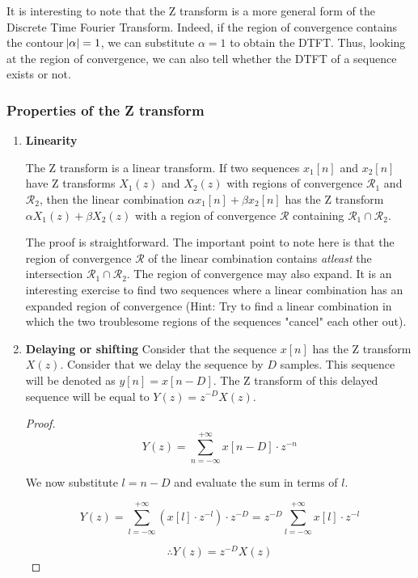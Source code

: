 \documentclass{article}
\theoremstyle{definition}
\begin{document}
It is interesting to note that the Z transform is a more general form of the Discrete Time Fourier Transform. Indeed, if the region of convergence contains the contour $\abs{\alpha} = 1$, we can substitute $\alpha = 1$ to obtain the DTFT. Thus, looking at the region of convergence, we can also tell whether the DTFT of a sequence exists or not. 

\subsubsection{Properties of the Z transform}

\begin{enumerate}
\item \textbf{Linearity}

The Z transform is a linear transform. If two sequences $x_1[n]$ and $x_2[n]$ have Z transforms $X_1(z)$ and $X_2(z)$ with regions of convergence $\mathcal{R}_1$ and $\mathcal{R}_2$, then the linear combination $\alpha x_1[n] + \beta x_2[n]$ has the Z transform $\alpha X_1(z) + \beta X_2(z)$ with a region of convergence $\mathcal{R}$ containing $\mathcal{R}_1 \cap \mathcal{R}_2$. \smallskip

The proof is straightforward. The important point to note here is that the region of convergence $\mathcal{R}$ of the linear combination contains \textit{atleast} the intersection $\mathcal{R}_1 \cap \mathcal{R}_2$. The region of convergence may also expand. It is an interesting exercise to find two sequences where a linear combination has an expanded region of convergence (Hint: Try to find a linear combination in which the two troublesome regions of the sequences "cancel" each other out).

\item \textbf{Delaying or shifting}
Consider that the sequence $x[n]$ has the Z transform $X(z)$. Consider that we delay the sequence by $D$ samples. This sequence will be denoted as $y[n] = x[n-D]$. The Z transform of this delayed sequence will be equal to $Y(z) = z^{-D} X(z)$. 
\begin{proof}
\[
	Y(z) = \sum_{n=-\infty}^{+\infty} x[n-D] \cdot z^{-n} 
\]

We now substitute $l = n-D$ and evaluate the sum in terms of $l$.

\[
	Y(z) = \sum_{l=-\infty}^{+\infty} \left( x[l] \cdot z^{-l} \right) \cdot z^{-D} = z^{-D} \sum_{l=-\infty}^{+\infty} x[l] \cdot z^{-l} 
\]

\[
	\therefore Y(z) = z^{-D} X(z)
\]
\end{proof}


\end{enumerate}
\end{document}
